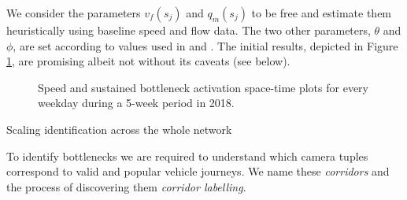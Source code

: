 \documentclass[final]{beamer}
\newlength{\colwidth}
\begin{document}
\begin{frame}[t]
\begin{columns}[t]
\begin{column}{\colwidth}
  We consider the parameters $v_f(s_j)$ and $q_m(s_j)$ to be free and estimate
  them heuristically using baseline speed and flow data. The two other
  parameters, $\theta$ and $\phi$, are set according to values used in
  \cite{chen2004} and \cite{he2016}. The initial results, depicted in Figure
  \ref{fig:motivating_example_5week}, are promising albeit not without its
  caveats (see below).

  \begin{figure}[t]
    \centering
    \caption{Speed and sustained bottleneck activation space-time plots for
             every weekday during a 5-week period in 2018.}
    \label{fig:motivating_example_5week}
  \end{figure}

  \begin{block}{Scaling identification across the whole network}


      To identify bottlenecks we are required to understand which camera tuples
      correspond to valid and popular vehicle journeys. We name these
      \emph{corridors} and the process of discovering them
      \emph{corridor labelling}.


\end{block}
\end{column}
\end{columns}
\end{frame}
\end{document}
